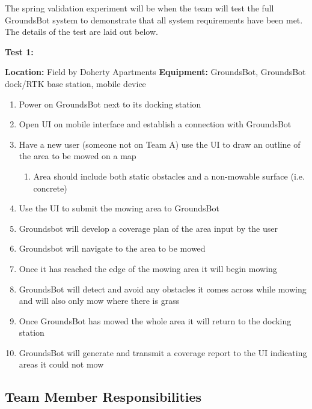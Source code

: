 \documentclass[12pt]{extarticle}
\begin{document}
	The spring validation experiment will be when the team will test the full GroundsBot system to demonstrate that all system requirements have been met. The details of the test are laid out below.
\begin{center}
\textbf{Test 1: }
\end{center}
\textbf{Location:} Field by Doherty Apartments
\textbf{Equipment:} GroundsBot, GroundsBot dock/RTK base station, mobile device
\begin{enumerate}
  \item Power on GroundsBot next to its docking station
  \item Open UI on mobile interface and establish a connection with GroundsBot
  \item Have a new user (someone not on Team A) use the UI to draw an outline of the area to be mowed on a map
  \begin{enumerate}
    \item Area should include both static obstacles and a non-mowable surface (i.e. concrete)
  \end{enumerate}
  \item Use the UI to submit the mowing area to GroundsBot
  \item Groundsbot will develop a coverage plan of the area input by the user
  \item Groundsbot will navigate to the area to be mowed
  \item Once it has reached the edge of the mowing area it will begin mowing
  \item GroundsBot will detect and avoid any obstacles it comes across while mowing and will also only mow where there is grass
  \item Once GroundsBot has mowed the whole area it will return to the docking station
  \item GroundsBot will generate and transmit a coverage report to the UI indicating areas it could not mow
\end{enumerate}
\subsection{Team Member Responsibilities}
\end{document}
